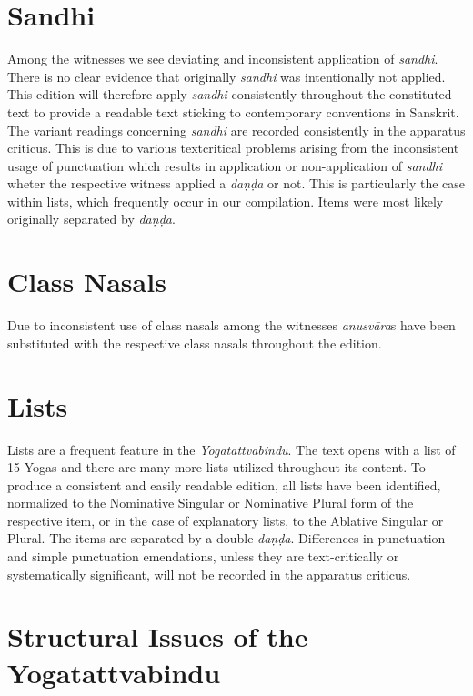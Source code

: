 \section{Sandhi}

Among the witnesses we see deviating and inconsistent application of \textit{sandhi}. There is no clear evidence that originally \textit{sandhi} was intentionally not applied. This edition will therefore apply \textit{sandhi} consistently throughout the constituted text to provide a readable text sticking to contemporary conventions in Sanskrit. The variant readings concerning \textit{sandhi} are recorded consistently in the apparatus criticus. This is due to various textcritical problems arising from the inconsistent usage of punctuation which results in application or non-application of \textit{sandhi} wheter the respective witness applied a \textit{daṇḍa} or not. This is particularly the case within lists, which frequently occur in our compilation. Items were most likely originally separated by \textit{daṇḍa}. 


\section{Class Nasals}

Due to inconsistent use of class nasals among the witnesses \textit{anusvāra}s have been substituted with the respective class nasals throughout the edition.

\section{Lists}

Lists are a frequent feature in the \textit{Yogatattvabindu}. The text opens with a list of 15 Yogas and there are many more lists utilized throughout its content. To produce a consistent and easily readable edition, all lists have been identified, normalized to the Nominative Singular or Nominative Plural form of the respective item, or in the case of explanatory lists, to the Ablative Singular or Plural. The items are separated by a double \textit{daṇḍa}. Differences in punctuation and simple punctuation emendations, unless they are text-critically or systematically significant, will not be recorded in the apparatus criticus.
\clearpage

\section{Structural Issues of the Yogatattvabindu}
\label{structure}

